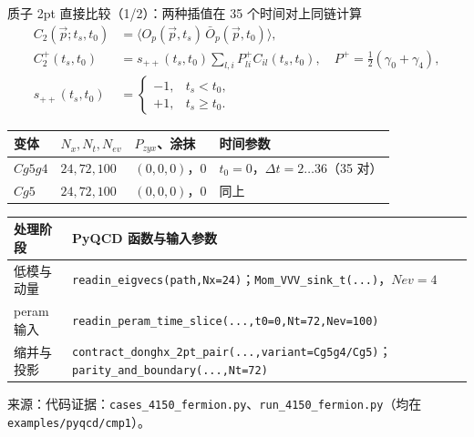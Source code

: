 \documentclass[UTF8,aspectratio=169,11pt]{ctexbeamer}
\newcommand{\source}[1]{\vspace{0.05em}\par{\raggedright\scriptsize\color{muted}来源：#1\par}}
\newcommand{\codepath}[1]{\nolinkurl{#1}}
\begin{document}
\begin{frame}[t]{质子 2pt 直接比较（1/2）：两种插值在 35 个时间对上同链计算}
  \footnotesize
  \setlength{\abovedisplayskip}{0.25em}
  \setlength{\belowdisplayskip}{0.25em}
  \renewcommand{\arraystretch}{0.92}
  \begin{align*}
    C_2(\vec p;t_s,t_0)&=\langle O_p(\vec p,t_s)\,\bar O_p(\vec p,t_0)\rangle,\\
    C_2^{+}(t_s,t_0)&=s_{++}(t_s,t_0)\sum_{l,i}P^+_{li}C_{il}(t_s,t_0),
    \quad P^+=\tfrac12(\gamma_0+\gamma_4),\\
    s_{++}(t_s,t_0)&=\begin{cases}-1,&t_s<t_0,\\+1,&t_s\ge t_0.\end{cases}
  \end{align*}
  \begin{tabularx}{0.96\textwidth}{@{}P{0.13\textwidth} P{0.16\textwidth} P{0.19\textwidth} Y@{}}
    \toprule
    变体 & $N_x,N_t,N_{ev}$ & $P_{zyx}$、涂抹 & 时间参数 \\
    \midrule
    $Cg5g4$ & $24,72,100$ & $(0,0,0)$，$0$ & $t_0=0$，$\Delta t=2\ldots36$（35 对） \\
    $Cg5$ & $24,72,100$ & $(0,0,0)$，$0$ & 同上 \\
    \bottomrule
  \end{tabularx}
  \vspace{0.16em}
  \begin{tabularx}{0.96\textwidth}{@{}P{0.22\textwidth}Y@{}}
    \toprule
    处理阶段 & PyQCD 函数与输入参数 \\
    \midrule
    低模与动量 & \codepath{readin_eigvecs(path,Nx=24)}；\codepath{Mom_VVV_sink_t(...)}，$Nev=4$ \\
    peram 输入 & \codepath{readin_peram_time_slice(...,t0=0,Nt=72,Nev=100)} \\
    缩并与投影 & \codepath{contract_donghx_2pt_pair(...,variant=Cg5g4/Cg5)}；\codepath{parity_and_boundary(...,Nt=72)} \\
    \bottomrule
  \end{tabularx}
  \vspace{-0.65em}
  \source{代码证据：\texttt{cases\_4150\_fermion.py}、\texttt{run\_4150\_fermion.py}（均在 \codepath{examples/pyqcd/cmp1}）。}
\end{frame}
\end{document}
